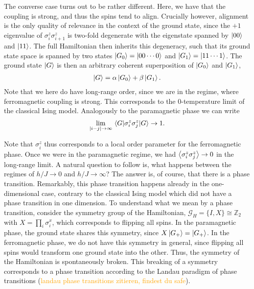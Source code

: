 The converse case turns out to be rather different. Here, we have that the
coupling is strong, and thus the spins tend to align. Crucially however,
alignment is the only quality of relevance in the context of the ground state,
since the $+1$ eigenvalue of $\sigma_i^z\sigma_{i+1}^z$ is two-fold degenerate
with the eigenstate spanned by $\ket{00}$ and $\ket{11}$. The full Hamiltonian
then inherits this degeneracy, such that its ground state space is spanned by
two states $\ket{G_0} = \ket{00\cdots 0}$ and $\ket{G_1} = \ket{11\cdots 1}$.
The ground state $\ket{G}$ is then an arbitrary coherent superposition of $\ket{G_0}$ and
$\ket{G_1}$,
\begin{align}
  \ket{G} = \alpha \ket{G_0} + \beta \ket{G_1}
.\end{align}
Note that we here do have long-range order, since we are in the
regime, where ferromagnetic coupling is strong. This corresponds to the
0-temperature limit of the classical Ising model. Analogously to the
paramagnetic phase we can write
\begin{align}
  \lim_{\abs{i-j}\to\infty} \expval{\sigma_i^z\sigma_j^z}{G} \to 1
.\end{align}

Note that $\sigma_i^z$ thus corresponds to a local order parameter for the
ferromagnetic phase. Once we were in the paramagnetic regime, we had
$\expval{\sigma_i^z\sigma_j^z}\to 0$ in the long-range limit. A natural
question to follow is, what happens between the regimes of
$h /J \to 0$ and $h /J \to \infty$? The answer is, of course, that there is a phase
transition. Remarkably, this phase transition happens already in the
one-dimensional case, contrary to the classical Ising model which did not have a phase
transition in one dimension. To understand what we mean by a phase 
transition, consider the symmetry group of the Hamiltonian, $\mathcal{G}_H =
\{I, X\} \cong \mathbb{Z}_2$ with $X = \prod_i \sigma_i^x$, which
corresponds to flipping all spins. In the paramagnetic phase, the ground state
shares this symmetry, since $X\ket{G_+} = \ket{G_+}$. In the ferromagnetic
phase, we do not have this symmetry in general, since flipping all spins would
transform one ground state into the other. Thus, the symmetry of the
Hamiltonian is spontaneously broken. This breaking of a symmetry corresponds to
a phase transition according to the Landau paradigm of phase transitions
(\textcolor{orange}{landau phase transitions zitieren, findest du safe}).

